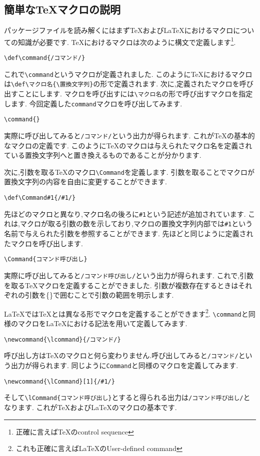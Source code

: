 \subsection{簡単な{\TeX}マクロの説明}
\newcommand{\lcommand}{/コマンド/}
\newcommand{\lCommand}[1]{/#1/}
{
\def\command{/コマンド/}
\def\Command#1{/#1/}

パッケージファイルを読み解くにはまず{\TeX}および{\LaTeX}におけるマクロについての知識が必要です.
{\TeX}におけるマクロは次のように構文で定義します\footnote{正確に言えば{\TeX}のcontrol sequence}.
\begin{verbatim}
\def\command{/コマンド/}
\end{verbatim}
これで\verb|\command|というマクロが定義されました.
このように{\TeX}におけるマクロは\verb|\def\マクロ名{\置換文字列}|の形で定義されます.
次に,定義されたマクロを呼び出すことにします.
マクロを呼び出すには\verb|\マクロ名|の形で呼び出すマクロを指定します.
今回定義した\verb|command|マクロを呼び出してみます.
\begin{verbatim}
\command{}
\end{verbatim}
実際に呼び出してみると\texttt{\command{}}という出力が得られます.
これが{\TeX}の基本的なマクロの定義です.
このように{\TeX}のマクロは与えられたマクロ名を定義されている置換文字列へと置き換えるものであることが分かります.

次に,引数を取る{\TeX}のマクロ\verb|\Command|を定義します.
引数を取ることでマクロが置換文字列の内容を自由に変更することができます.
\begin{verbatim}
\def\Command#1{/#1/}
\end{verbatim}
先ほどのマクロと異なり,マクロ名の後ろに\verb|#1|という記述が追加されています.
これは,マクロが取る引数の数を示しており,マクロの置換文字列内部では\verb|#1|という名前で与えられた引数を参照することができます.
先ほどと同じように定義されたマクロを呼び出します.
\begin{verbatim}
\Command{コマンド呼び出し}
\end{verbatim}
実際に呼び出してみると\texttt{\Command{コマンド呼び出し}}という出力が得られます.
これで,引数を取る{\TeX}マクロを定義することができました.
引数が複数存在するときはそれぞれの引数を\{\}で囲むことで引数の範囲を明示します.

{\LaTeX}では{\TeX}とは異なる形でマクロを定義することができます\footnote{これも正確に言えば{\LaTeX}のUser-defined command}.
\verb|\command|と同様のマクロを{\LaTeX}における記法を用いて定義してみます.
\begin{verbatim}
\newcommand{\lcommand}{/コマンド/}
\end{verbatim}
}
呼び出し方は{\TeX}のマクロと何ら変わりません.呼び出してみると\texttt{\lcommand{}}という出力が得られます.
同じように\verb|Command|と同様のマクロを定義してみます.
\begin{verbatim}
\newcommand{\lCommand}[1]{/#1/}
\end{verbatim}
そして\verb|\lCommand{コマンド呼び出し}|とすると得られる出力は\texttt{\lCommand{コマンド呼び出し}}となります.
これが{\TeX}および{\LaTeX}のマクロの基本です.

